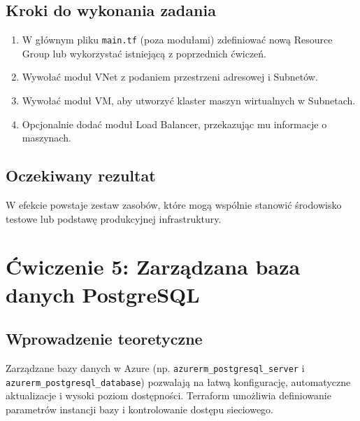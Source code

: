 \documentclass{article}
\begin{document}
\subsection{Kroki do wykonania zadania}
\begin{enumerate}
    \item W głównym pliku \texttt{main.tf} (poza modułami) zdefiniować nową Resource Group lub wykorzystać istniejącą z poprzednich ćwiczeń.
    \item Wywołać moduł VNet z podaniem przestrzeni adresowej i Subnetów.
    \item Wywołać moduł VM, aby utworzyć klaster maszyn wirtualnych w Subnetach.
    \item Opcjonalnie dodać moduł Load Balancer, przekazując mu informacje o maszynach.
\end{enumerate}

\subsection{Oczekiwany rezultat}
W efekcie powstaje zestaw zasobów, które mogą wspólnie stanowić środowisko testowe lub podstawę produkcyjnej infrastruktury.

\section{Ćwiczenie 5: Zarządzana baza danych PostgreSQL}

\subsection{Wprowadzenie teoretyczne}
Zarządzane bazy danych w Azure (np. \texttt{azurerm\_postgresql\_server} i \texttt{azurerm\_postgresql\_database}) pozwalają na łatwą konfigurację, automatyczne aktualizacje i wysoki poziom dostępności. Terraform umożliwia definiowanie parametrów instancji bazy i kontrolowanie dostępu sieciowego.
\end{document}
